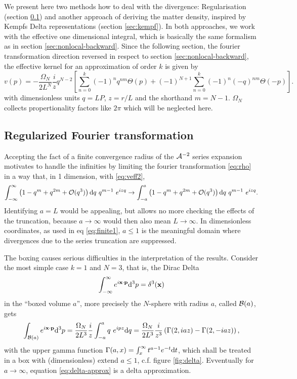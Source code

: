\documentclass[10pt,a4paper]{article}
\begin{document}
We present here two methods how to deal with the divergence: Regularisation (section \ref{sec:reg}) and another approach of deriving the matter density, inspired by Kempfs Delta representations (section \ref{sec:kempf}). In both approaches, we work with the effective one dimensional integral, which is basically the same formalism as in section \ref{sec:nonlocal-backward}. Since the following section, the fourier transformation direction reversed in respect to section \ref{sec:nonlocal-backward}, the effective kernel for an approximation of order $k$ is given by
%
\begin{equation}\label{eq:veff2}
v(p) = - \frac{\Omega_N}{2 L^N} \frac{i}{z} q^{N-2} \left[
\sum^k_{n=0} (-1)^n q^{n m} \Theta(p) +
(-1)^{N+1}\sum^k_{n=0} (-1)^n (-q)^{n m} \Theta(-p) \right].
\end{equation}
with dimensionless units $q=LP$, $z=r/L$ and the shorthand $m=N-1$. $\Omega_N$ collects propertionality factors like $2\pi$ which will be neglected here.

\subsection{Regularized Fourier transformation}\label{sec:reg}
Accepting the fact of a finite convergence radius of the ${\cal A}^{-2}$ series expansion motivates to handle the infinities by limiting the fourier transformation \eqref{eq:rho} in a way that, in 1 dimension, with \eqref{eq:veff2},
\begin{equation}\label{eq:finite1}
\int_{-\infty}^\infty 
\left(1 - q^m + q^{2m} + {\cal O}(q^3)\right)
\mathrm{d} q~q^{m-1}~e^{i z q}
\to 
\int_{-a}^a
\left(1 - q^m + q^{2m} + {\cal O}(q^3)\right)
\mathrm{d} q~q^{m-1}~e^{i z q}.
\end{equation}
%
Identifying $a=L$ would be appealing, but allows no more checking the effects of the truncation, because $a\to \infty$ would then also mean $L\to \infty$. In dimensionless coordinates, as used in eq \eqref{eq:finite1}, $a \leq 1$ is the meaningful domain where divergences due to the series truncation are suppressed.

The boxing causes serious difficulties in the interpretation of the results. Consider the most simple case $k=1$ and $N=3$, that is, the Dirac Delta
\begin{equation}
\int_{-\infty}^\infty e^{i \mathbf{ x } \cdot \mathbf{ p }} \mathrm{d}^3 p = \delta^3(\mathbf{ x })
\end{equation}
in the ``boxed volume $a$'', more precisely the $N$-sphere with radius $a$, called ${\cal B}(a)$, gets
\begin{equation}\label{eq:delta-approx}
\int_{{\cal B}(a)} e^{i \mathbf{ x } \cdot \mathbf{ p }} \mathrm{d}^3 p = 
\frac{\Omega_N}{2 L^3} \frac{i}{z} \int_{-a}^a
q~e^{ipz} \mathrm{d} q = 
\frac{\Omega_N}{2 L^3} \frac{i}{z^3}
\left( \Gamma(2, iaz) - \Gamma(2, -iaz) \right),
\end{equation}
with the upper gamma function $\Gamma(a,x) = \int_x^\infty t^{a-1} e^{-t} \mathrm{d} t$, which shall be treated in a box with (dimensionless) extend $a \leq 1$, c.f. figure \ref{fig:delta}. Evventually for $a\to\infty$, equation \eqref{eq:delta-approx} is a delta approximation.
\end{document}
